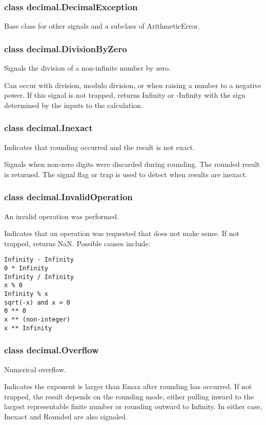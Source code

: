 \subsubsection{class decimal.DecimalException}

Base class for other signals and a subclass of ArithmeticError.

\subsubsection{class decimal.DivisionByZero}

Signals the division of a non-infinite number by zero.

Can occur with division, modulo division, or when raising a number to a negative power. If this signal is not trapped, returns Infinity or -Infinity with the sign determined by the inputs to the calculation.

\subsubsection{class decimal.Inexact}

Indicates that rounding occurred and the result is not exact.

Signals when non-zero digits were discarded during rounding. The rounded result is returned. The signal flag or trap is used to detect when results are inexact.

\subsubsection{class decimal.InvalidOperation}

An invalid operation was performed.

Indicates that an operation was requested that does not make sense. If not trapped, returns NaN. Possible causes include:

\begin{lstlisting}
Infinity - Infinity
0 * Infinity
Infinity / Infinity
x % 0
Infinity % x
sqrt(-x) and x > 0
0 ** 0
x ** (non-integer)
x ** Infinity
\end{lstlisting}

\subsubsection{class decimal.Overflow}

Numerical overflow.

Indicates the exponent is larger than Emax after rounding has occurred. If not trapped, the result depends on the rounding mode, either pulling inward to the largest representable finite number or rounding outward to Infinity. In either case, Inexact and Rounded are also signaled.

